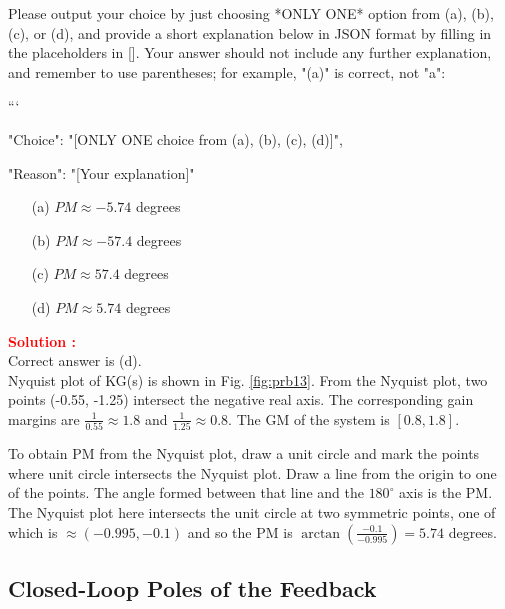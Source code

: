 \documentclass[12pt]{article}
\begin{document}
Please output your choice by just choosing *ONLY ONE* option from (a), (b), (c), or (d), and provide a short explanation below in JSON format by filling in the placeholders in []. Your answer should not include any further explanation, and remember to use parentheses; for example, "(a)" is correct, not "a":

```
{

"Choice": "[ONLY ONE choice from (a), (b), (c), (d)]",

"Reason": "[Your explanation]"

}

\begin{itemize}
    \item[(a)] \(PM \approx -5.74\) degrees
    \item[(b)] \(PM \approx -57.4\) degrees
    \item[(c)] \(PM \approx 57.4\) degrees
    \item[(d)] \(PM \approx 5.74\) degrees
\end{itemize}

\textbf{\textcolor{red}{Solution :}} \\
Correct answer is (d).\\
Nyquist plot of KG(s) is shown in Fig. \ref{fig:prb13}. From the Nyquist plot, two points (-0.55, -1.25) intersect the negative real axis. The
corresponding gain margins are $\frac{1}{0.55} \approx 1.8$ and $\frac{1}{1.25} \approx 0.8$. The GM of the system is $[0.8,1.8]$.

To obtain PM from the Nyquist plot, draw a unit circle and mark the points where unit
circle intersects the Nyquist plot. Draw a line from the origin to one of the points. The
angle formed between that line and the $180^\circ$ axis is the PM. The Nyquist plot here
intersects the unit circle at two symmetric points, one of which is $\approx(-0.995, -0.1)$ and
so the PM is $\arctan\left( \frac{-0.1}{-0.995}\right)= 5.74$ degrees.
\clearpage

\subsection{Closed-Loop Poles of the Feedback}
\end{document}
